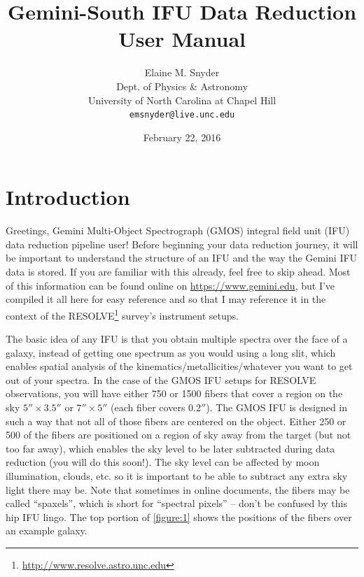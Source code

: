 \documentclass[12pt]{report}
\begin{document}
\title{Gemini-South IFU Data Reduction User Manual}
\author{Elaine M. Snyder\\
Dept. of Physics \& Astronomy\\
University of North Carolina at Chapel Hill \\
\texttt{emsnyder@live.unc.edu}}
\date{February 22, 2016}
\maketitle

\hypersetup{linkcolor=magenta}
\tableofcontents
\listoftables
\listoffigures


\chapter{Introduction}
Greetings, Gemini Multi-Object Spectrograph (GMOS) integral field unit (IFU) data reduction pipeline user! Before beginning your data reduction journey, it will be important to understand the structure of an IFU and the way the Gemini IFU data is stored. If you are familiar with this already, feel free to skip ahead. Most of this information can be found online on \url{https://www.gemini.edu}, but I've compiled it all here for easy reference and so that I may reference it in the context of the RESOLVE\footnote{\url{http://www.resolve.astro.unc.edu}} survey's instrument setups.

The basic idea of any IFU is that you obtain multiple spectra over the face of a galaxy, instead of getting one spectrum as you would using a long slit, which enables spatial analysis of the kinematics/metallicities/whatever you want to get out of your spectra. In the case of the GMOS IFU setups for RESOLVE observations, you will have either 750 or 1500 fibers that cover a region on the sky $5''\times3.5''$ or $7''\times5''$ (each fiber covers $0.2''$). The GMOS IFU is designed in such a way that not all of those fibers are centered on the object. Either 250 or 500 of the fibers are positioned on a region of sky away from the target (but not too far away), which enables the sky level to be later subtracted during data reduction (you will do this soon!). The sky level can be affected by moon illumination, clouds, etc. so it is important to be able to subtract any extra sky light there may be. Note that sometimes in online documents, the fibers may be called ``spaxels'', which is short for ``spectral pixels'' -- don't be confused by this hip IFU lingo. The top portion of \autoref{figure:1} shows the positions of the fibers over an example galaxy.
\end{document}
